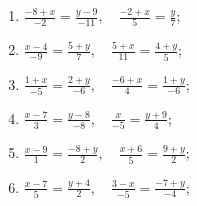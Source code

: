 	\vspace{10pt}
	\begin{enumerate}
		\setcounter{enumi}{\value{tasks}}

			\item \( \displaystyle \frac{-8+x}{-2} = \frac{y-9}{-11}, \quad \frac{-2+x}{5} = \frac{y}{7} \);
			\item \( \displaystyle \frac{x-4}{-9} = \frac{5+y}{7}, \quad \frac{5+x}{11} = \frac{4+y}{5} \);
			\item \( \displaystyle \frac{1+x}{-5} = \frac{2+y}{-6}, \quad \frac{-6+x}{4} = \frac{1+y}{-6} \);
			\item \( \displaystyle \frac{x-7}{3} = \frac{y-8}{-8}, \quad \frac{x}{-5} = \frac{y+9}{4} \);
			\item \( \displaystyle \frac{x-9}{1} = \frac{-8+y}{2}, \quad \frac{x+6}{5} = \frac{9+y}{2} \);
			\item \( \displaystyle \frac{x-7}{5} = \frac{y+4}{2}, \quad \frac{3-x}{-5} = \frac{-7+y}{-4} \);

		\setcounter{tasks}{\value{enumi}}
	\end{enumerate}

